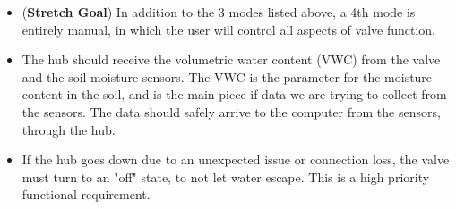 \documentclass[onecolumn, draftclsnofoot,10pt, compsoc]{IEEEtran}
\newcounter{subsubsubsection}[subsubsection]
\newcounter{subsubsubsubsection}[subsubsubsection]
\begin{document}
\begin{itemize}
             				\item{(\textbf{Stretch Goal}) In addition to the 3 modes listed above, a 4th mode is entirely manual, in which the user will control all aspects of valve function.}
			\item{The hub should receive the volumetric water content (VWC) from the valve and the soil moisture sensors.
            The VWC is the parameter for the moisture content in the soil, and is the main piece if data we are trying to collect from the sensors.
            The data should safely arrive to the computer from the sensors, through the hub.}
            
            \item{If the hub goes down due to an unexpected issue or connection loss, the valve must turn to an "off" state, to not let water escape.
            This is a high priority functional requirement.}
          
          \end{itemize}
\end{document}
